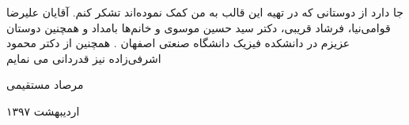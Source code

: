 \acknowledge
جا دارد از دوستانی که در تهیه این قالب به من کمک نموده‌اند تشکر کنم. آقایان علیرضا قوامی‌نیا، فرشاد قریبی، دکتر سید حسین موسوی  و خانم‌ها بامداد  و همچنین دوستان عزیزم در دانشکده فیزیک دانشگاه صنعتی اصفهان . همچنین از دکتر محمود اشرفی‌زاده نیز قدردانی می نمایم

 \vspace{0.5cm}
\hspace*{10.4cm} 
\hfill
مرصاد مستقیمی

\hfill
اردیبهشت ۱۳۹۷


